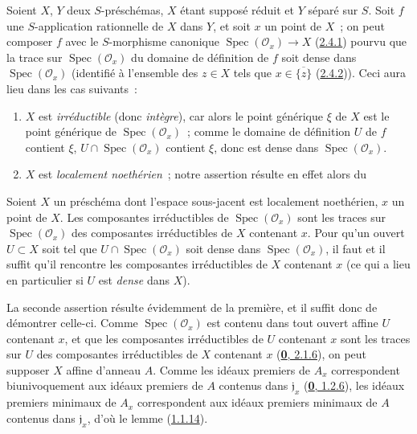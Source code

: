 \begin{env}[7.2.8]
\label{I.7.2.8-fr}
Soient $X$, $Y$ deux $S$-préschémas, $X$ étant supposé réduit et $Y$ séparé
sur $S$. Soit $f$ une $S$-application rationnelle de $X$ dans $Y$, et soit
$x$ un point de $X$~; on peut composer $f$ avec le $S$-morphisme canonique
$\operatorname{Spec}(\mathscr{O}_x)\to X$
(\hyperref[I.2.4.1-fr]{2.4.1}) pourvu que la trace sur
$\operatorname{Spec}(\mathscr{O}_x)$ du domaine de définition de $f$ soit
dense dans $\operatorname{Spec}(\mathscr{O}_x)$ (identifié à l'ensemble des
$z\in X$ tels que $x\in\overline{\{z\}}$
(\hyperref[I.2.4.2-fr]{2.4.2})). Ceci aura lieu dans les cas suivants~:
\begin{enumerate}
  \item[1\textsuperscript{o}] $X$ est \emph{irréductible} (donc \emph{intègre}), car alors
    le point générique $\xi$ de $X$ est le point générique de
    $\operatorname{Spec}(\mathscr{O}_x)$~; comme le domaine de définition $U$
    de $f$ contient $\xi$, $U\cap\operatorname{Spec}(\mathscr{O}_x)$ contient
    $\xi$, donc est dense dans $\operatorname{Spec}(\mathscr{O}_x)$.
  \item[2\textsuperscript{o}] $X$ est \emph{localement noethérien}~; notre assertion
    résulte en effet alors du
\end{enumerate}
\end{env}

\begin{lemma}[7.2.8.1]
\label{I.7.2.8.1-fr}
Soient $X$ un préschéma dont l'espace sous-jacent est localement noethérien,
$x$ un point de $X$. Les composantes irréductibles de
$\operatorname{Spec}(\mathscr{O}_x)$ sont les traces sur
$\operatorname{Spec}(\mathscr{O}_x)$ des composantes irréductibles de $X$
contenant $x$. Pour qu'un ouvert $U\subset X$ soit tel que
$U\cap\operatorname{Spec}(\mathscr{O}_x)$ soit dense dans
$\operatorname{Spec}(\mathscr{O}_x)$, il faut et il suffit qu'il rencontre les
composantes irréductibles de $X$ contenant $x$ \textup{(ce qui a lieu en particulier
si $U$ est \emph{dense} dans $X$)}.
\end{lemma}

La seconde assertion résulte évidemment de la première, et il suffit donc de
démontrer celle-ci. Comme $\operatorname{Spec}(\mathscr{O}_x)$ est contenu
dans tout ouvert affine $U$ contenant $x$, et que les composantes
irréductibles de $U$ contenant $x$ sont les traces sur $U$ des composantes
irréductibles de $X$ contenant $x$
(\hyperref[0.2.1.6-fr]{\textbf{0}, 2.1.6}), on peut supposer $X$ affine d'anneau $A$.
Comme les idéaux premiers de $A_x$ correspondent biunivoquement aux idéaux
premiers
de $A$ contenus dans $\mathfrak{j}_x$
(\hyperref[0.1.2.6-fr]{\textbf{0}, 1.2.6}), les idéaux premiers minimaux de $A_x$
correspondent aux idéaux premiers minimaux de $A$ contenus dans
$\mathfrak{j}_x$, d'où le lemme (\hyperref[I.1.1.14-fr]{1.1.14}).

